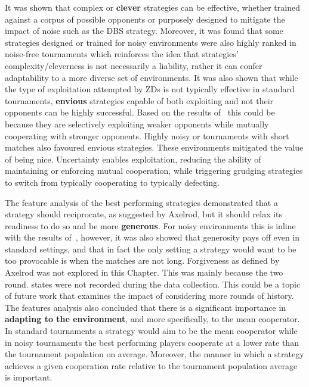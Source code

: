 It was shown that complex or \textbf{clever} strategies can be effective,
whether trained against a corpus of possible opponents or purposely designed to
mitigate the impact of noise such as the DBS strategy. Moreover, it was found
that some strategies designed or trained for noisy environments were also highly
ranked in noise-free tournaments which reinforces the idea that strategies'
complexity/cleverness is not necessarily a liability, rather it can confer
adaptability to a more diverse set of environments.
It was also shown that while the type of exploitation attempted by ZDs is
not typically effective in standard tournaments, \textbf{envious} strategies
capable of both exploiting and not their opponents can be highly successful.
Based on the results of~\cite{Harper2017} this could be because they are
selectively exploiting weaker opponents while mutually cooperating with stronger
opponents. Highly noisy or tournaments with short matches also favoured envious
strategies. These environments mitigated the value of being nice. Uncertainty
enables exploitation, reducing the ability of maintaining or enforcing mutual
cooperation, while triggering grudging strategies to switch from typically
cooperating to typically defecting.

The feature analysis of the best performing strategies demonstrated that a
strategy should reciprocate, as suggested by Axelrod, but it should relax its
readiness to do so and be more \textbf{generous}. For noisy environments this is
inline with the results of~\cite{Bendor1991, Donninger1986, Molander1985,
Hammerstein1984}, however, it was also showed that generosity pays off even in
standard settings, and that in fact the only setting a strategy would want to be
too provocable is when the matches are not long. Forgiveness as defined by
Axelrod was not explored in this Chapter. This was mainly because the two round. %
states were not recorded during the data collection. This could be a topic of
future work that examines the impact of considering more rounds of history. The
features analysis also concluded that there is a significant importance in
\textbf{adapting to the environment}, and more specifically, to the mean
cooperator. In standard tournaments a strategy would aim to be the mean
cooperator while in noisy tournaments the best performing players cooperate at a
lower rate than the tournament population on average. Moreover, the manner in
which a strategy achieves a given cooperation rate relative to the tournament
population average is important.

